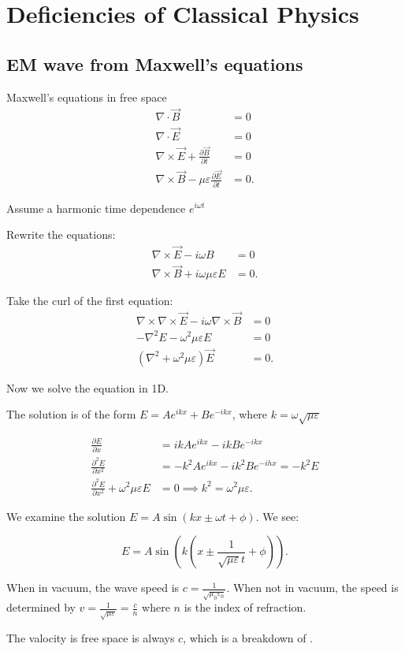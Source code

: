 	
\section{Deficiencies of Classical Physics}
\subsection{EM wave from Maxwell's equations}
Maxwell's equations in free space
\begin{align*}
	\nabla \cdot \vec B &= 0\\
	\nabla \cdot \vec E &= 0\\
	\nabla \times \vec E + \frac{\partial \vec B }{\partial t }  &= 0\\
	\nabla \times \vec B - \mu \varepsilon \frac{\partial \vec E }{\partial t }  &= 0
.\end{align*}

Assume a harmonic time dependence $e^{i \omega t}$

Rewrite the equations:
\begin{align*}
	\nabla \times \vec E - i \omega B &= 0\\
	\nabla \times \vec{B} + i \omega \mu \varepsilon E &= 0
.\end{align*}

Take the curl of the first equation:
\begin{align*}
	\nabla \times \nabla \times \vec{E} -i \omega \nabla \times \vec{B}  &= 0 \\
	- \nabla^2 E - \omega^2 \mu\varepsilon E &= 0 \\
	\left( \nabla^2 + \omega^2 \mu\varepsilon  \right) \vec{E} &= 0
.\end{align*}

Now we solve the equation in 1D. 

The solution is of the form $E = Ae^{ikx}+Be^{-ikx}$, where $k = \omega\sqrt{\mu\varepsilon } $

\begin{align*}
	\frac{\partial E }{\partial x} &= i k A e ^{ikx} - ikBe^{-ikx}\\
	\frac{\partial ^2 E }{\partial x^2 } &= -k^{2} A e ^{ikx } - i k^2 B e^{-i h x }= - k^2 E \\
	\frac{\partial ^2 E }{\partial x^2 } + \omega^2 \mu\varepsilon E &= 0 \implies k^2 = \omega^2 \mu\varepsilon
.\end{align*}

We examine the solution $E = A \sin\left( kx \pm \omega t + \phi \right) $. We see:

\begin{equation}
E = A \sin\left( k\left( x \pm \frac{1}{\sqrt{\mu\varepsilon } t }+ \phi \right)  \right) 
.\end{equation} 

When in vacuum, the wave speed is $c = \frac{1}{\sqrt{\mu_0\varepsilon_0} }$. When not in vacuum, the speed is determined by $v = \frac{1}{\sqrt{\mu\varepsilon} } = \frac{c}{n}$ where $n$ is the index of refraction.

The valocity is free space is always $c$, which is a breakdown of .

